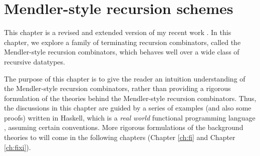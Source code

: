 \chapter{Mendler-style recursion schemes}\label{ch:mendler}

This chapter is a revised and extended version of
my recent work \cite{AhnShe11}. In this chapter,
we explore a family of terminating recursion combinators,
called the Mendler-style recursion combinators, which behaves
well over a wide class of recursive datatypes.

The purpose of this chapter is to give the reader an intuition understanding of
the Mendler-style recursion combinators, rather than providing a rigorous
formulation of the theories behind the Mendler-style recursion combinators.
Thus, the discussions in this chapter are guided by a series of examples
(and also some proofs) written in Haskell, which is a \emph{real world}
functional programming language \cite{OSullivan08}, assuming certain
conventions. More rigorous formulations of the background theories to will come
in the following chapters (Chapter \ref{ch:fi} and Chapter \ref{ch:fixi}).





